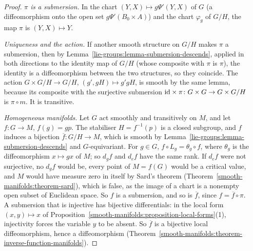 \begin{proof}
\emph{$\pi$ is a submersion.} In the chart $(Y, X) \mapsto g\Psi'(Y, X)$ of $G$ (a diffeomorphism onto the open set $g\Psi'(B_0 \times A)$) and the chart
$\varphi_g$ of $G/H$, the map $\pi$ is $(Y, X) \mapsto Y$.

\emph{Uniqueness and the action.} If another smooth structure on $G/H$ makes $\pi$ a submersion, then by Lemma~\ref{lie-groups:lemma-submersion-descends},
applied in both directions to the identity map of $G/H$ (whose composite with $\pi$ is $\pi$), the identity is a diffeomorphism between the two structures, so
they coincide. The action $G \times G/H \to G/H$, $(g', gH) \mapsto g'gH$, is smooth by the same lemma, because its composite with the surjective submersion
$\mathrm{id} \times \pi \colon G \times G \to G \times G/H$ is $\pi \circ m$. It is transitive.

\emph{Homogeneous manifolds.} Let $G$ act smoothly and transitively on $M$, and let $f \colon G \to M$, $f(g) = gp$. The stabiliser $H = f^{-1}(p)$ is a
closed subgroup, and $f$ induces a bijection $\overline{f} \colon G/H \to M$, which is smooth by Lemma~\ref{lie-groups:lemma-submersion-descends} and
$G$-equivariant. For $g \in G$, $f \circ L_g = \theta_g \circ f$, where $\theta_g$ is the diffeomorphism $x \mapsto gx$ of $M$; so $d_gf$ and $d_ef$ have the
same rank. If $d_ef$ were not surjective, no $d_gf$ would be, every point of $M = f(G)$ would be a critical value, and $M$ would have measure zero in itself by
Sard's theorem (Theorem~\ref{smooth-manifolds:theorem-sard}), which is false, as the image of a chart is a nonempty open subset of Euclidean space. So $f$ is a
submersion, and so is $\overline{f}$, since $f = \overline{f} \circ \pi$. A submersion that is injective has bijective differentials: in the local form
$(x, y) \mapsto x$ of Proposition~\ref{smooth-manifolds:proposition-local-forms}(1), injectivity forces the variable $y$ to be absent. So $\overline{f}$ is a
bijective local diffeomorphism, hence a diffeomorphism (Theorem~\ref{smooth-manifolds:theorem-inverse-function-manifolds}).
\end{proof}

